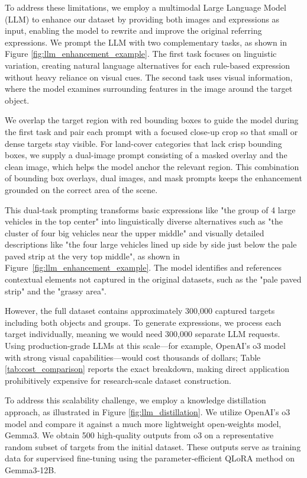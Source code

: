 To address these limitations, we employ a multimodal Large Language Model (LLM) to enhance our dataset by providing both images and expressions as input, enabling the model to rewrite and improve the original referring expressions. We prompt the LLM with two complementary tasks, as shown in Figure \ref{fig:llm_enhancement_example}. The first task focuses on linguistic variation, creating natural language alternatives for each rule-based expression without heavy reliance on visual cues. The second task uses visual information, where the model examines surrounding features in the image around the target object.

We overlap the target region with red bounding boxes to guide the model during the first task and pair each prompt with a focused close-up crop so that small or dense targets stay visible. For land-cover categories that lack crisp bounding boxes, we supply a dual-image prompt consisting of a masked overlay and the clean image, which helps the model anchor the relevant region. This combination of bounding box overlays, dual images, and mask prompts keeps the enhancement grounded on the correct area of the scene.

This dual-task prompting transforms basic expressions like "the group of 4 large vehicles in the top center" into linguistically diverse alternatives such as "the cluster of four big vehicles near the upper middle" and visually detailed descriptions like "the four large vehicles lined up side by side just below the pale paved strip at the very top middle", as shown in Figure~\ref{fig:llm_enhancement_example}. The model identifies and references contextual elements not captured in the original datasets, such as the "pale paved strip" and the "grassy area".

However, the full dataset contains approximately 300,000 captured targets including both objects and groups. To generate expressions, we process each target individually, meaning we would need 300,000 separate LLM requests. Using production-grade LLMs at this scale—for example, OpenAI’s o3 model\cite{o3} with strong visual capabilities—would cost thousands of dollars; Table \ref{tab:cost_comparison} reports the exact breakdown, making direct application prohibitively expensive for research-scale dataset construction.

To address this scalability challenge, we employ a knowledge distillation approach, as illustrated in Figure \ref{fig:llm_distillation}. We utilize OpenAI’s o3 model\cite{o3} and compare it against a much more lightweight open‑weights model, Gemma3\cite{gemma3}. We obtain 500 high‑quality outputs from o3 on a representative random subset of targets from the initial dataset. These outputs serve as training data for supervised fine‑tuning using the parameter‑efficient QLoRA method\cite{qlora} on Gemma3‑12B.

